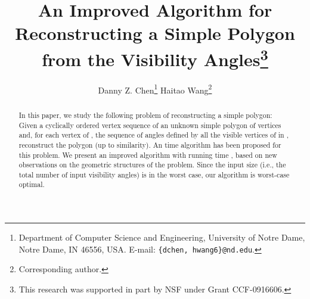 \documentclass[11pt]{article}
\def\sectionspace{\vspace*{0in}}
\begin{document}
\baselineskip=14.0pt

\title{
\vspace*{-0.55in} An Improved Algorithm for Reconstructing a Simple
Polygon from the Visibility Angles\thanks{This research was
supported in part by NSF under Grant CCF-0916606.}}

\author{
Danny Z. Chen\thanks{Department of Computer Science and Engineering,
University of Notre Dame, Notre Dame, IN 46556, USA.
E-mail: {\tt \{dchen, hwang6\}@nd.edu}.
}
\hspace*{0.2in} Haitao Wang\footnotemark[2] \thanks{Corresponding
author.
}}


\date{}

\maketitle

\thispagestyle{empty}

\newtheorem{lemma}{Lemma}
\newtheorem{theorem}{Theorem}
\newtheorem{corollary}{Corollary}
\newtheorem{fact}{Fact}
\newtheorem{definition}{Definition}
\newtheorem{observation}{Observation}
\newtheorem{condition}{Condition}
\newtheorem{property}{Property}
\newtheorem{claim}{Claim}
\newenvironment{proof}{\noindent {\textbf{Proof:}}\rm}{\hfill 
\rm}


\pagestyle{plain}
\setcounter{page}{1}

\vspace*{-0.2in}
\begin{abstract}
In this paper, we study the following problem of reconstructing a
simple polygon: Given a cyclically 
ordered vertex sequence of an unknown simple polygon  of  vertices and, for each vertex
 of , the sequence of angles defined by all the visible vertices of  in ,
reconstruct the polygon  (up to
similarity). An 
time algorithm has been proposed for this problem. 
We present an improved algorithm 
with running time ,
based on new observations on the geometric structures of the problem.
Since the input size (i.e., the total number of input visibility angles) is
 in the worst case, our algorithm is worst-case optimal. 
\end{abstract}



\sectionspace
\end{document}
